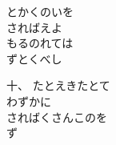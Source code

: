 \documentclass[10pt,b5j]{tarticle} %
\begin{document}
\begin{enumerate}
\begin{minipage}[c]{\blocksize}
        \vspace{\linespace}
        \item
        とかくのいを\\
        さればえよ\\
        もるのれては\\
        ずとくべし
        
        \vspace{\linespace}
        \item[十、]
        たとえきたとて\\
        わずかに\\
        さればくさんこのを\\
        ず
    
    \end{minipage}
\end{enumerate} %
\end{document}
